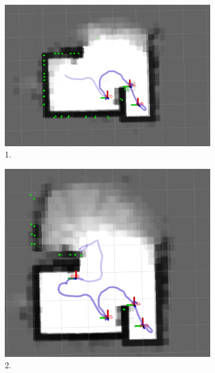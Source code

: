 \begin{figure}[ht!]
    \centering
    \begin{subfigure}[b]{0.4\linewidth}
      \includegraphics[width=0.9\linewidth]{figures/building2_open_01.png}
       \caption{1.}
    \end{subfigure}
    \begin{subfigure}[b]{0.4\linewidth}
      \includegraphics[width=0.9\linewidth]{figures/building2_open_02.png}
      \caption{2.}
    \end{subfigure}
    \begin{subfigure}[b]{0.4\linewidth}

\end{subfigure}
\end{figure}
